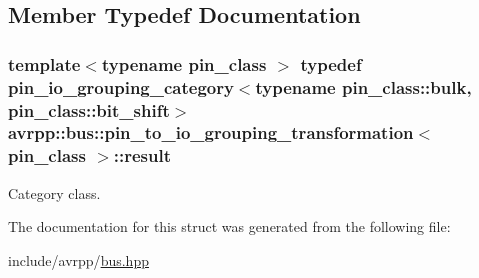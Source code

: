 \subsection{Member Typedef Documentation}
\hypertarget{structavrpp_1_1bus_1_1pin__to__io__grouping__transformation_abc7845cc4338956086ecbf86cd67f674}{
\subsubsection[{result}]{\setlength{\rightskip}{0pt plus 5cm}template$<$typename pin\_\-class $>$ typedef {\bf pin\_\-io\_\-grouping\_\-category}$<$typename pin\_\-class::bulk, pin\_\-class::bit\_\-shift$>$ {\bf avrpp::bus::pin\_\-to\_\-io\_\-grouping\_\-transformation}$<$ pin\_\-class $>$::{\bf result}}}
\label{structavrpp_1_1bus_1_1pin__to__io__grouping__transformation_abc7845cc4338956086ecbf86cd67f674}


Category class. 



The documentation for this struct was generated from the following file:\begin{DoxyCompactItemize}
\item 
include/avrpp/\hyperlink{bus_8hpp}{bus.hpp}\end{DoxyCompactItemize}
